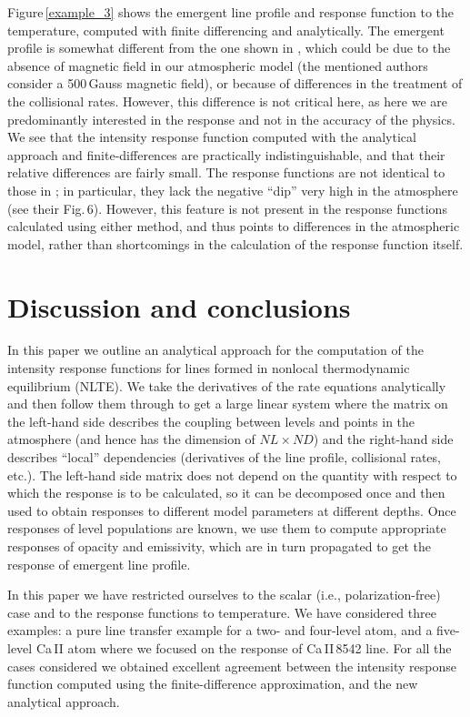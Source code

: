 \documentclass[referee]{aa}
\begin{document}
Figure\,\ref{example_3} shows the emergent line profile and response function to the temperature, computed with finite differencing and analytically. The emergent profile is somewhat different from the one shown in \cite{Ca_diag_Jaime}, which could be due to the absence of magnetic field in our atmospheric model (the mentioned authors consider a 500\,Gauss magnetic field), or because of differences in the treatment of the collisional rates. However, this difference is not critical here, as here we are predominantly interested in the response and not in the accuracy of the physics. We see that the intensity response function computed with the analytical approach and finite-differences are practically indistinguishable, and that their relative differences are fairly small. The response functions are not identical to those in \cite{Ca_diag_Jaime}; in particular, they lack the negative ``dip'' very high in the atmosphere (see their Fig.\,6). However, this feature is not present in the response functions calculated using either method, and thus points to differences in the atmospheric model, rather than shortcomings in the calculation of the response function itself.

\section{Discussion and conclusions}

In this paper we  outline an analytical approach for the computation of the intensity response functions for lines formed in nonlocal thermodynamic equilibrium (NLTE). We take the derivatives of the rate equations analytically and then follow them through to get a large linear system where the matrix on the left-hand side describes the coupling between levels and points in the atmosphere (and hence has the dimension of $NL\times ND$) and the right-hand side describes ``local'' dependencies (derivatives of the line profile, collisional rates, etc.). The left-hand side matrix does not depend on the quantity with respect to which the response is to be calculated, so it can be decomposed once and then used to obtain responses to different model parameters at different depths. Once responses of level populations are known, we use them to compute appropriate responses of opacity and emissivity, which are  in turn propagated  to get the response of emergent line profile.

In this paper we have restricted ourselves to the scalar (i.e., polarization-free) case and to the response functions to temperature. We have considered three examples: a pure line transfer example for a two- and four-level atom, and a five-level Ca\,II atom where we focused on the response of Ca\,II\,8542 line. For all the cases considered we obtained excellent agreement between the intensity response function computed using the finite-difference approximation, and the new analytical approach. 
\end{document}
